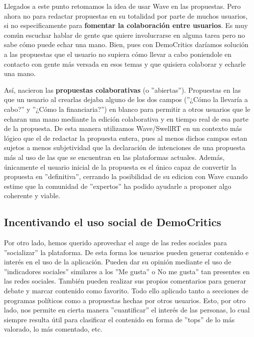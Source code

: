 Llegados a este punto retomamos la idea de usar Wave en las propuestas. Pero ahora no para redactar propuestas en su totalidad por parte de muchos usuarios, si no especificamente para \textbf{fomentar la colaboración entre usuarios}. Es muy común escuchar hablar de gente que quiere involucrarse en alguna tarea pero no sabe cómo puede echar una mano. Bien, pues con DemoCritics daríamos solución a las propuestas que el usuario no supiera cómo llevar a cabo poniendole en contacto con gente más versada en esos temas y que quisiera colaborar y echarle una mano. 

Así, nacieron las \textbf{propuestas colaborativas} (o ''abiertas''). Propuestas en las que un usuario al crearlas dejaba alguno de los dos campos (''¿Cómo la llevaría a cabo?'' y ''¿Cómo la financiaria?'') en blanco para permitir a otros usuarios que le echaran una mano mediante la edición colaborativa y en tiempo real de esa parte de la propuesta. De esta manera utilizamos Wave/SwellRT en un contexto más lógico que el de redactar la propuesta entera, pues al menos dichos campos estan sujetos a menos subjetividad que la declaración de intenciones de una propuesta más al uso de las que se encuentran en las plataformas actuales. Además, únicamente el usuario inicial de la propuesta es el único capaz de convertir la propuesta en ''definitiva'', cerrando la posibilidad de su edicion con Wave cuando estime que la comunidad de ''expertos'' ha podido ayudarle a proponer algo coherente y viable. 


\subsection{Incentivando el uso social de DemoCritics}

Por otro lado, hemos querido aprovechar el auge de las redes sociales para ''socializar'' la plataforma. De esta forma los usuarios pueden generar contenido e interés en el uso de la aplicación. Pueden dar su opinión mediante el uso de ''indicadores sociales'' similares a los ''Me gusta'' o No me gusta'' tan presentes en las redes sociales. También pueden realizar sus propios comentarios para generar debate y marcar contenido como favorito. Todo ello aplicado tanto a secciones de programas políticos como a propuestas hechas por otros usuarios. Esto, por otro lado, nos permite en cierta manera ''cuantificar'' el interés de las personas, lo cual siempre resulta útil para clasificar el contenido en forma de ''tops'' de lo más valorado, lo más comentado, etc. 


